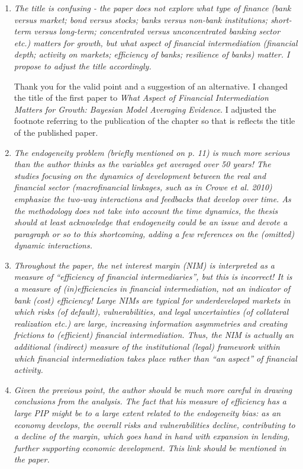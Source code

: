 \begin{enumerate}
       
    \item \textit{The title is confusing - the paper does not explore what type of finance (bank versus market; bond versus stocks; banks versus non-bank institutions; short-term versus long-term; concentrated versus unconcentrated banking sector etc.) matters for growth, but what aspect of financial intermediation (financial depth; activity on markets; efficiency of banks; resilience of banks) matter. I propose to adjust the title accordingly.}
    
    Thank you for the valid point and a suggestion of an alternative. I changed the title of the first paper to \emph{What Aspect of Financial Intermediation Matters for Growth: Bayesian Model Averaging Evidence}. I adjusted the footnote referring to the publication of the chapter so that is reflects the title of the published paper.

    \item \textit{The endogeneity problem (briefly mentioned on p. 11) is much more serious than the author thinks as the variables get averaged over 50 years! The studies focusing on the dynamics of development between the real and financial sector (macrofinancial linkages, such as in Crowe et al. 2010) emphasize the two-way interactions and feedbacks that develop over time. As the methodology does not take into account the time dynamics, the thesis should at least acknowledge that endogeneity could be an issue and devote a paragraph or so to this shortcoming, adding a few references on the (omitted) dynamic interactions.}
    
    \item \textit{Throughout the paper, the net interest margin (NIM) is interpreted as a measure of ``efficiency of financial intermediaries'', but this is incorrect! It is a measure of (in)efficiencies in financial intermediation, not an indicator of bank (cost) efficiency! Large NIMs are typical for underdeveloped markets in which risks (of default), vulnerabilities, and legal uncertainties (of collateral realization etc.) are large, increasing information asymmetries and creating frictions to (efficient) financial intermediation. Thus, the NIM is actually an additional (indirect) measure of the institutional (legal) framework within which financial intermediation takes place rather than ``an aspect'' of financial activity.}

    \item \textit{Given the previous point, the author should be much more careful in drawing conclusions from the analysis. The fact that his measure of efficiency has a large PIP might be to a large extent related to the endogeneity bias: as an economy develops, the overall risks and vulnerabilities decline, contributing to a decline of the margin, which goes hand in hand with expansion in lending, further supporting economic development. This link should be mentioned in the paper.}    
    

\end{enumerate}

